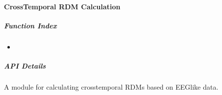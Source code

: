 \documentclass[letterpaper,10pt,english]{sphinxhowto}
\begin{document}
\sphinxstepscope

\clearpage


\paragraph{Cross\sphinxhyphen{}Temporal RDM Calculation}
\label{\detokenize{ctrdm_cal:cross-temporal-rdm-calculation}}\label{\detokenize{ctrdm_cal::doc}}
\sphinxAtStartPar
{}


\subparagraph{Function Index}
\label{\detokenize{ctrdm_cal:function-index}}\begin{itemize}
\item {} 
\sphinxAtStartPar
{}

\end{itemize}


\subparagraph{API Details}
\label{\detokenize{ctrdm_cal:module-neurora.ctrdm_cal}}\label{\detokenize{ctrdm_cal:api-details}}
\sphinxAtStartPar
A module for calculating cross\sphinxhyphen{}temporal RDMs based on EEG\sphinxhyphen{}like data.
\end{document}
